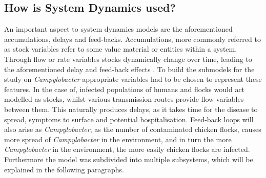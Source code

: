 \subsection{How is System Dynamics used?}
An important aspect to system dynamics models are the aforementioned accumulations, delays and feed-backs. Accumulations, more commonly referred to as stock variables refer to some value material or entities within a system. Through flow or rate variables stocks dynamically change over time, leading to the aforementioned delay and feed-back effects \parencite{sterman_system_2001}. To build the submodels for the study on \textit{Campylobacter} appropriate variables had to be chosen to represent these features. In the case of, infected populations of humans and flocks would act modelled as stocks, whilst various transmission routes provide flow variables between them. This naturally produces delays, as it takes time for the disease to spread, symptoms to surface and potential hospitalisation. Feed-back loops will also arise as \textit{Campylobacter}, as the number of contaminated chicken flocks, causes more spread of \textit{Campylobacter} in the environment, and in turn the more \textit{Campylobacter} in the environment, the more easily chicken flocks are infected. Furthermore the model was subdivided into multiple subsystems, which will be explained in the following paragraphs. 


